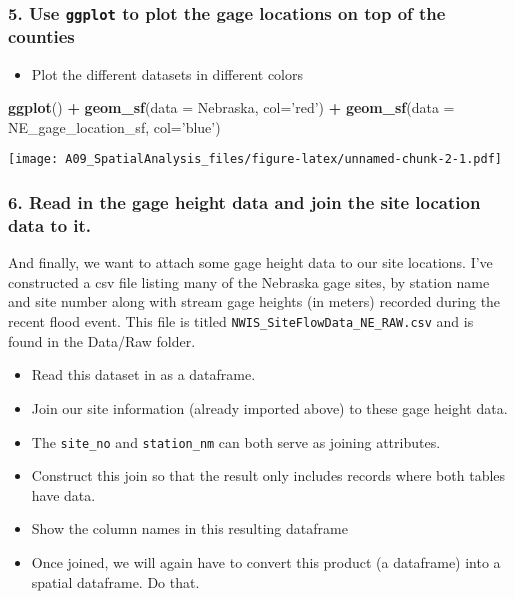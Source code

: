 \documentclass[]{article}
\newenvironment{Shaded}{\begin{snugshade}}{\end{snugshade}}
\newcommand{\KeywordTok}[1]{\textcolor[rgb]{0.13,0.29,0.53}{\textbf{#1}}}
\newcommand{\DataTypeTok}[1]{\textcolor[rgb]{0.13,0.29,0.53}{#1}}
\newcommand{\StringTok}[1]{\textcolor[rgb]{0.31,0.60,0.02}{#1}}
\newcommand{\OperatorTok}[1]{\textcolor[rgb]{0.81,0.36,0.00}{\textbf{#1}}}
\newcommand{\NormalTok}[1]{#1}
\providecommand{\tightlist}{%
  \setlength{\itemsep}{0pt}\setlength{\parskip}{0pt}}
\begin{document}
\subsubsection{\texorpdfstring{5. Use \texttt{ggplot} to plot the gage
locations on top of the
counties}{5. Use ggplot to plot the gage locations on top of the counties}}\label{use-ggplot-to-plot-the-gage-locations-on-top-of-the-counties}

\begin{itemize}
\tightlist
\item
  Plot the different datasets in different colors
\end{itemize}

\begin{Shaded}
\begin{Highlighting}[]
\KeywordTok{ggplot}\NormalTok{() }\OperatorTok{+}\StringTok{ }
\StringTok{  }\KeywordTok{geom_sf}\NormalTok{(}\DataTypeTok{data =}\NormalTok{ Nebraska, }\DataTypeTok{col=}\StringTok{'red'}\NormalTok{) }\OperatorTok{+}\StringTok{ }
\StringTok{  }\KeywordTok{geom_sf}\NormalTok{(}\DataTypeTok{data =}\NormalTok{ NE_gage_location_sf, }\DataTypeTok{col=}\StringTok{'blue'}\NormalTok{)}
\end{Highlighting}
\end{Shaded}

\texttt{[image: A09\_SpatialAnalysis\_files/figure-latex/unnamed-chunk-2-1.pdf]}

\subsubsection{6. Read in the gage height data and join the site
location data to
it.}\label{read-in-the-gage-height-data-and-join-the-site-location-data-to-it.}

And finally, we want to attach some gage height data to our site
locations. I've constructed a csv file listing many of the Nebraska gage
sites, by station name and site number along with stream gage heights
(in meters) recorded during the recent flood event. This file is titled
\texttt{NWIS\_SiteFlowData\_NE\_RAW.csv} and is found in the Data/Raw
folder.

\begin{itemize}
\tightlist
\item
  Read this dataset in as a dataframe.
\item
  Join our site information (already imported above) to these gage
  height data.
\item
  The \texttt{site\_no} and \texttt{station\_nm} can both serve as
  joining attributes.
\item
  Construct this join so that the result only includes records where
  both tables have data.
\item
  Show the column names in this resulting dataframe
\item
  Once joined, we will again have to convert this product (a dataframe)
  into a spatial dataframe. Do that.
\end{itemize}
\end{document}
